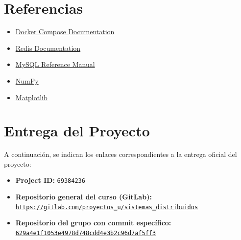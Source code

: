 \documentclass[12pt]{article}
\begin{document}
\newpage
\section{Referencias}
\begin{itemize}
    \item \href{https://docs.docker.com/compose/}{Docker Compose Documentation}
    \item \href{https://redis.io/docs/}{Redis Documentation}
    \item \href{https://dev.mysql.com/doc/}{MySQL Reference Manual}
    \item \href{https://numpy.org/}{NumPy}
    \item \href{https://matplotlib.org/}{Matplotlib}
\end{itemize}

\newpage
\section{Entrega del Proyecto}

A continuación, se indican los enlaces correspondientes a la entrega oficial del proyecto:

\begin{itemize}
    \item \textbf{Project ID:} \texttt{69384236}
    
    \item \textbf{Repositorio general del curso (GitLab):} \\
    \href{https://gitlab.com/proyectos_u/sistemas_distribuidos}{\texttt{https://gitlab.com/proyectos\_u/sistemas\_distribuidos}}

    \item \textbf{Repositorio del grupo con commit específico:} \\
    \href{https://gitlab.com/proyectos_u/sistemas_distribuidos/-/tree/629a4e1f1053e4978d748cdd4e3b2c96d7af5ff3/}{\texttt{629a4e1f1053e4978d748cdd4e3b2c96d7af5ff3}}

  
\end{itemize}
\end{document}
